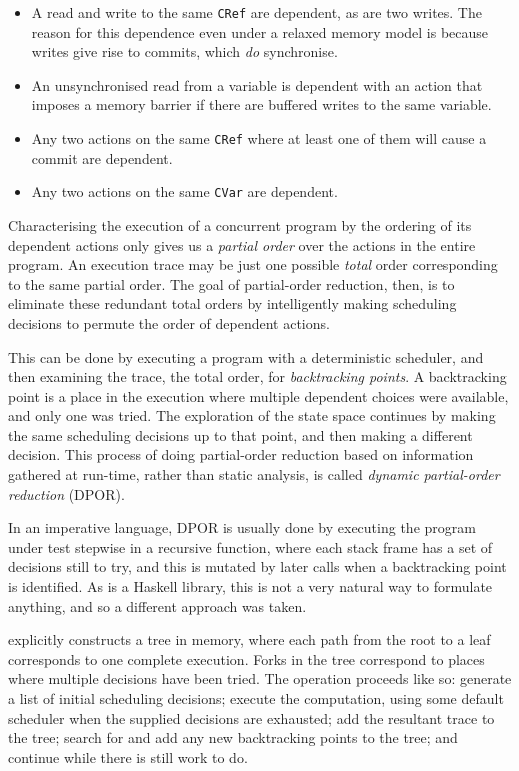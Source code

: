 \begin{itemize}
\item A read and write to the same \verb|CRef| are dependent, as are
  two writes. The reason for this dependence even under a relaxed
  memory model is because writes give rise to commits, which \emph{do}
  synchronise.

\item An unsynchronised read from a variable is dependent with an
  action that imposes a memory barrier if there are buffered writes to
  the same variable.

\item Any two actions on the same \verb|CRef| where at least one of
  them will cause a commit are dependent.

\item Any two actions on the same \verb|CVar| are dependent.
\end{itemize}

Characterising the execution of a concurrent program by the ordering
of its dependent actions only gives us a \emph{partial order} over the
actions in the entire program. An execution trace may be just one
possible \emph{total} order corresponding to the same partial
order. The goal of partial-order reduction, then, is to eliminate
these redundant total orders by intelligently making scheduling
decisions to permute the order of dependent actions.

This can be done by executing a program with a deterministic
scheduler, and then examining the trace, the total order, for
\emph{backtracking points}. A backtracking point is a place in the
execution where multiple dependent choices were available, and only
one was tried. The exploration of the state space continues by making
the same scheduling decisions up to that point, and then making a
different decision. This process of doing partial-order reduction
based on information gathered at run-time, rather than static
analysis, is called \emph{dynamic partial-order reduction} (DPOR).


In an imperative language, DPOR is usually done by executing the
program under test stepwise in a recursive function, where each stack
frame has a set of decisions still to try, and this is mutated by
later calls when a backtracking point is identified. As \dejafu{} is a
Haskell library, this is not a very natural way to formulate anything,
and so a different approach was taken.

\dejafu{} explicitly constructs a tree in memory, where each path from
the root to a leaf corresponds to one complete execution. Forks in the
tree correspond to places where multiple decisions have been
tried. The operation proceeds like so: generate a list of initial
scheduling decisions; execute the computation, using some default
scheduler when the supplied decisions are exhausted; add the resultant
trace to the tree; search for and add any new backtracking points to
the tree; and continue while there is still work to do.

